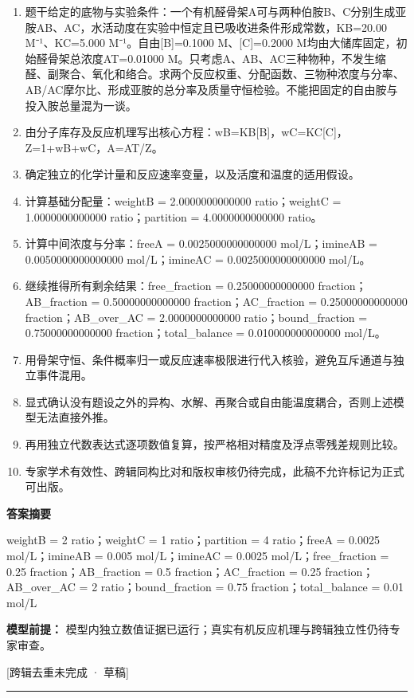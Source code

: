 \documentclass[UTF8,11pt,a4paper]{ctexart}
\begin{document}
\begin{enumerate}
\item 题干给定的底物与实验条件：一个有机醛骨架A可与两种伯胺B、C分别生成亚胺AB、AC，水活动度在实验中恒定且已吸收进条件形成常数，KB=20.00 M⁻¹、KC=5.000 M⁻¹。自由[B]=0.1000 M、[C]=0.2000 M均由大储库固定，初始醛骨架总浓度AT=0.01000 M。只考虑A、AB、AC三种物种，不发生缩醛、副聚合、氧化和络合。求两个反应权重、分配函数、三物种浓度与分率、AB/AC摩尔比、形成亚胺的总分率及质量守恒检验。不能把固定的自由胺与投入胺总量混为一谈。
\item 由分子库存及反应机理写出核心方程：wB=KB[B]，wC=KC[C]，Z=1+wB+wC，A=AT/Z。
\item 确定独立的化学计量和反应速率变量，以及活度和温度的适用假设。
\item 计算基础分配量：weightB = 2.0000000000000 ratio；weightC = 1.0000000000000 ratio；partition = 4.0000000000000 ratio。
\item 计算中间浓度与分率：freeA = 0.0025000000000000 mol/L；imineAB = 0.0050000000000000 mol/L；imineAC = 0.0025000000000000 mol/L。
\item 继续推得所有剩余结果：free\_fraction = 0.25000000000000 fraction；AB\_fraction = 0.50000000000000 fraction；AC\_fraction = 0.25000000000000 fraction；AB\_over\_AC = 2.0000000000000 ratio；bound\_fraction = 0.75000000000000 fraction；total\_balance = 0.010000000000000 mol/L。
\item 用骨架守恒、条件概率归一或反应速率极限进行代入核验，避免互斥通道与独立事件混用。
\item 显式确认没有题设之外的异构、水解、再聚合或自由能温度耦合，否则上述模型无法直接外推。
\item 再用独立代数表达式逐项数值复算，按严格相对精度及浮点零残差规则比较。
\item 专家学术有效性、跨辑同构比对和版权审核仍待完成，此稿不允许标记为正式可出版。
\end{enumerate}
\noindent\textbf{答案摘要}\par
weightB = 2 ratio；weightC = 1 ratio；partition = 4 ratio；freeA = 0.0025 mol/L；imineAB = 0.005 mol/L；imineAC = 0.0025 mol/L；free\_fraction = 0.25 fraction；AB\_fraction = 0.5 fraction；AC\_fraction = 0.25 fraction；AB\_over\_AC = 2 ratio；bound\_fraction = 0.75 fraction；total\_balance = 0.01 mol/L\par
\noindent\textbf{模型前提：}
模型内独立数值证据已运行；真实有机反应机理与跨辑独立性仍待专家审查。\par
\noindent\textcolor{red!65!black}{[跨辑去重未完成 · 草稿]} \par
\medskip\hrule\medskip
{}
\end{document}
